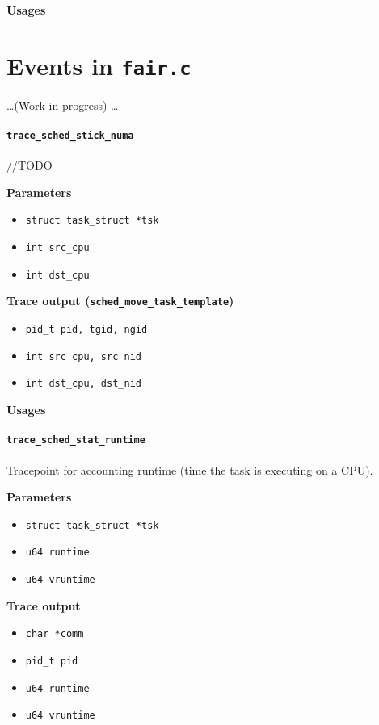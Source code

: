 \textbf{Usages}
\begin{code}

\end{code}

\section{Events in \texttt{fair.c}}
\dots (Work in progress) \dots
\paragraph{\texttt{trace\_sched\_stick\_numa}}
//TODO

\textbf{Parameters}
\begin{itemize}
    \item \verb|struct task_struct *tsk|
    \item \verb|int src_cpu|
    \item \verb|int dst_cpu|
\end{itemize}

\textbf{Trace output (\texttt{sched\_move\_task\_template})}
\begin{itemize}
    \item \verb|pid_t pid, tgid, ngid|
    \item \verb|int src_cpu, src_nid|
    \item \verb|int dst_cpu, dst_nid|
\end{itemize}

\textbf{Usages}
\begin{code}

\end{code}

\paragraph{\texttt{trace\_sched\_stat\_runtime}}
Tracepoint for accounting runtime (time the task is executing on a CPU).

\textbf{Parameters}
\begin{itemize}
    \item \verb|struct task_struct *tsk|
    \item \verb|u64 runtime|
    \item \verb|u64 vruntime|    
\end{itemize}

\textbf{Trace output}
\begin{itemize}
    \item \verb|char *comm|
    \item \verb|pid_t pid|
    \item \verb|u64 runtime|
    \item \verb|u64 vruntime|
\end{itemize}

